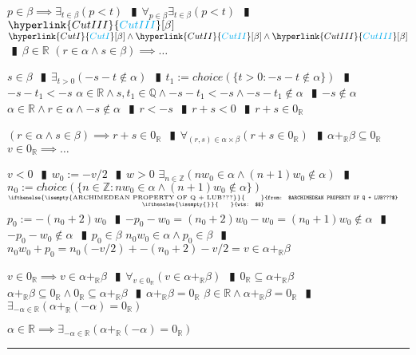 \documentclass{book}
\newcommand{\rf}[1]{\hyperlink{#1}{\textcolor{cyan}{#1}}}
\newcommand{\abr}{:=}
\newcommand{\pipe}{$\phantom{(}\vrectangleblack\phantom{)}$}
\newcommand{\ann}[2]{%
  \hfill %
  $\stackrel%
  {\hbox{\tiny{\ifthenelse{\isempty{#1}}%
    {\phantom{from}}%
    {from: $#1$}}}}%
  {\hbox{\tiny{\ifthenelse{\isempty{#2}}%
    {\phantom{wts}}%
    {wts: $#2$}}}}$%
\ }
\begin{document}
\begin{enumerate}
\begin{enumerate}
\begin{enumerate}
    \end{enumerate}
    \lit $p \in \beta \implies \exists_{t \in \beta}(p < t)$ \pipe $\forall_{p \in \beta} \exists_{t \in \beta}(p < t)$ \pipe $\rf{CutIII}[\beta]$
    \lit $\rf{CutI}[\beta] \land \rf{CutII}[\beta] \land \rf{CutIII}[\beta]$ \pipe $\beta \in \mathbb{R}$
    \lit $(r \in \alpha \land s \in \beta) \implies \ldots$
    \begin{enumerate}
      \lit $s \in \beta$ \pipe $\exists_{t > 0}(-s - t \notin \alpha)$ \pipe $t_1 \abr choice(\{t > 0 : -s - t \notin \alpha\})$ \pipe $-s - t_1 < -s$
      \lit $\alpha \in \mathbb{R} \land s, t_1 \in \mathbb{Q} \land -s - t_1 < -s \land -s - t_1 \notin \alpha$ \pipe $-s \notin \alpha$
      \lit $\alpha \in \mathbb{R} \land r \in \alpha \land -s \notin \alpha$ \pipe $r < -s$ \pipe $r + s < 0$ \pipe $r + s \in 0_{\mathbb{R}}$
    \end{enumerate}
    \lit $(r \in \alpha \land s \in \beta) \implies r + s \in 0_\mathbb{R}$ \pipe $\forall_{(r, s) \in \alpha \times \beta}(r + s \in 0_{\mathbb{R}})$ \pipe $\alpha +_{\mathbb{R}} \beta \subseteq 0_{\mathbb{R}}$
    \lit $v \in 0_{\mathbb{R}} \implies \ldots$
    \begin{enumerate}
      \lit $v < 0$ \pipe $w_0 \abr -v/2$ \pipe $w > 0$
      \lit $\exists_{n \in \mathbb{Z}}(n w_0 \in \alpha \land (n + 1) w_0 \notin \alpha)$ \pipe $n_0 \abr choice(\{n \in \mathbb{Z} : n w_0 \in \alpha \land (n + 1) w_0 \notin \alpha\})$    \ann{ARCHIMEDEAN PROPERTY OF Q + LUB???}{}
      \lit $p_0 \abr -(n_0 + 2) w_0$ \pipe $-p_0 - w_0 = (n_0 + 2) w_0 - w_0 = (n_0 + 1) w_0 \notin \alpha$ \pipe $-p_0 - w_0 \notin \alpha$ \pipe $p_0 \in \beta$
      \lit $n_0 w_0 \in \alpha \land p_0 \in \beta$ \pipe $n_0 w_0 + p_0 = n_0 (-v/2) + -(n_0 + 2) -v/2 = v \in \alpha +_{\mathbb{R}} \beta$
    \end{enumerate}      
    \lit $v \in 0_{\mathbb{R}} \implies v \in \alpha +_{\mathbb{R}} \beta$ \pipe $\forall _{v \in 0_{\mathbb{R}}}(v \in \alpha +_{\mathbb{R}} \beta)$ \pipe $0_{\mathbb{R}} \subseteq \alpha +_{\mathbb{R}} \beta$
    \lit $\alpha +_{\mathbb{R}} \beta \subseteq 0_{\mathbb{R}} \land 0_{\mathbb{R}} \subseteq \alpha +_{\mathbb{R}} \beta$ \pipe $\alpha +_{\mathbb{R}} \beta = 0_{\mathbb{R}}$ 
    \lit $\beta \in \mathbb{R} \land \alpha +_{\mathbb{R}} \beta = 0_{\mathbb{R}}$ \pipe $\exists_{-\alpha \in \mathbb{R}}(\alpha +_{\mathbb{R}} (-\alpha) = 0_{\mathbb{R}})$
  \end{enumerate}
  \lit $\alpha \in \mathbb{R} \implies \exists_{-\alpha \in \mathbb{R}}(\alpha +_{\mathbb{R}} (-\alpha) = 0_{\mathbb{R}})$
\end{enumerate} \vspace{.75mm} \hrule \vspace{.75mm} \ \\
\end{document}
